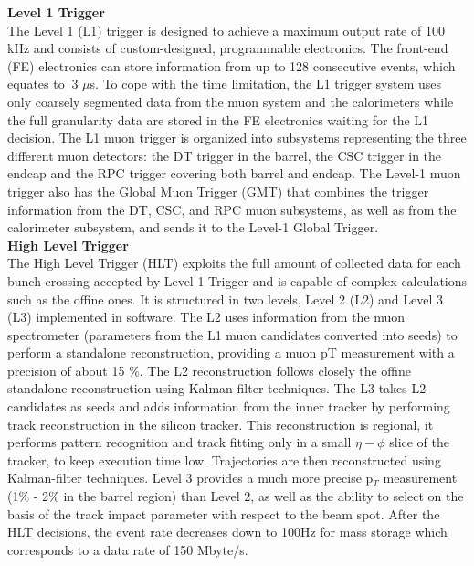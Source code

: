 {\bf Level 1 Trigger} \\
The Level 1 (L1) trigger is designed to achieve a maximum output rate of 100
kHz and consists of custom-designed, programmable electronics. The front-end (FE)
electronics can store information from up to 128 consecutive events, which equates
to $~$3 $\mu$s. To cope with the time limitation, the L1 trigger system uses only coarsely
segmented data from the muon system and the calorimeters while the full granularity
data are stored in the FE electronics waiting for the L1 decision. The L1 muon trigger
is organized into subsystems representing the three different muon detectors: the DT
trigger in the barrel, the CSC trigger in the endcap and the RPC trigger covering
both barrel and endcap. The Level-1 muon trigger also has the Global Muon Trigger
(GMT) that combines the trigger information from the DT, CSC, and RPC muon
subsystems, as well as from the calorimeter subsystem, and sends it to the Level-1
Global Trigger.\\


{\bf High Level Trigger }\\

The High Level Trigger (HLT) exploits the full amount of collected data for each
bunch crossing accepted by Level 1 Trigger and is capable of complex calculations
such as the offine ones. It is structured in two levels, Level 2 (L2) and Level 3
(L3) implemented in software. The L2 uses information from the muon spectrometer
(parameters from the L1 muon candidates converted into seeds) to perform a standalone
reconstruction, providing a muon pT measurement with a precision of about
15 $\%$. The L2 reconstruction follows closely the offine standalone reconstruction using
Kalman-filter techniques. The L3 takes L2 candidates as seeds and adds information
from the inner tracker by performing track reconstruction in the silicon tracker. This
reconstruction is regional, it performs pattern recognition and track fitting only in
a small $\eta - \phi $ slice of the tracker, to keep execution time low. Trajectories are then
reconstructed using Kalman-filter techniques. Level 3 provides a much more precise
p$_T$ measurement (1$\%$ - 2$\%$ in the barrel region) than Level 2, as well as the ability
to select on the basis of the track impact parameter with respect to the beam spot.
After the HLT decisions, the event rate decreases down to 100Hz for mass storage
which corresponds to a data rate of 150 Mbyte$/$s.


